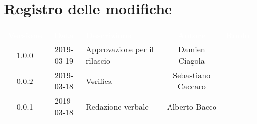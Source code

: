 \section*{Registro delle modifiche}
{
	\renewcommand{\arraystretch}{1.5}
	\centering
	\begin{longtable}{ c c  C{4cm}  c  c }
		
		\textcolor{white}{\textbf{Versione}} & \textcolor{white}{\textbf{Data}} & \textcolor{white}{\textbf{Descrizione}} & \textcolor{white}{\textbf{Autore}} & \textcolor{white}{\textbf{Ruolo}}\\
		1.0.0 & 2019-03-19 & Approvazione per il rilascio & Damien Ciagola & \Res{}\\
		0.0.2 & 2019-03-18 & Verifica & Sebastiano Caccaro & \ver{}\\
		0.0.1 & 2019-03-18 & Redazione verbale & Alberto Bacco & \reda{}\\
		
		
	\end{longtable}
	
}